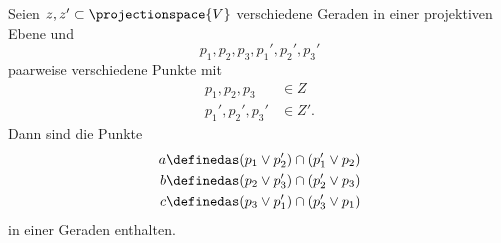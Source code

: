 \begin{satz}[Pappos]
  Seien \( z,z'\subset \projectionspace{V} \) verschiedene Geraden in einer projektiven Ebene und
  \begin{equation*}
    p_1,p_2,p_3,p_1',p_2',p_3'
  \end{equation*}
  paarweise verschiedene Punkte mit
  \begin{align*}
    p_1,p_2,p_3&\in Z\\
    p_1',p_2',p_3'&\in Z'.
  \end{align*}
  Dann sind die Punkte
  \begin{align*}
    a&\definedas (p_1\vee p_2')\cap (p_1'\vee p_2)\\
    b&\definedas (p_2\vee p_3')\cap (p_2'\vee p_3)\\
    c&\definedas (p_3\vee p_1')\cap (p_3'\vee p_1)
  \end{align*}
  in einer Geraden enthalten.
\end{satz}
